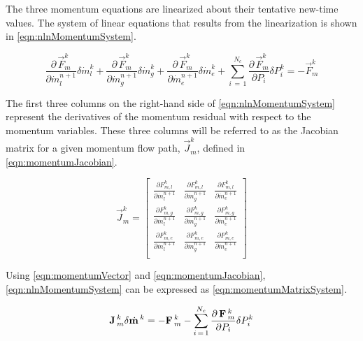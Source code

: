 The three momentum equations are linearized about their tentative new-time values.
The system of linear equations that results from the linearization is shown in \eqref{eqn:nlnMomentumSystem}.

\begin{equation}
\label{eqn:nlnMomentumSystem}
\frac{\partial\, \vec{F}^{k}_{m}}{\partial \dot{m}^{n+1}_{l}} \delta \dot{m}_{l}^{k} + \frac{\partial\, \vec{F}^{k}_{m}}{\partial \dot{m}^{n+1}_{g}} \delta \dot{m}_{g}^{k} + \frac{\partial\, \vec{F}^{k}_{m}}{\partial \dot{m}^{n+1}_{e}} \delta \dot{m}_{e}^{k} + \sum_{i\,=\,1}^{N_{c}} \frac{\partial\, \vec{F}^{k}_{m}}{\partial P_{i}} \delta P_{i}^{k} = - \vec{F}^{k}_{m}
\end{equation}

The first three columns on the right-hand side of \eqref{eqn:nlnMomentumSystem} represent the derivatives of the momentum residual with respect to the momentum variables.
These three columns will be referred to as the Jacobian matrix for a given momentum flow path, $\vec{J}^{k}_{m}$, defined in \eqref{eqn:momentumJacobian}.

\begin{equation}
\label{eqn:momentumJacobian}
\vec{J}^{k}_{m} = 
\begin{bmatrix}
\frac{\partial F^{k}_{m,l}}{\partial \dot{m}^{n+1}_{l}} & \frac{\partial F^{k}_{m,l}}{\partial \dot{m}^{n+1}_{g}} & \frac{\partial F^{k}_{m,l}}{\partial \dot{m}^{n+1}_{e}} \\
\frac{\partial F^{k}_{m,g}}{\partial \dot{m}^{n+1}_{l}} & \frac{\partial F^{k}_{m,g}}{\partial \dot{m}^{n+1}_{g}} & \frac{\partial F^{k}_{m,g}}{\partial \dot{m}^{n+1}_{e}} \\
\frac{\partial F^{k}_{m,e}}{\partial \dot{m}^{n+1}_{l}} & \frac{\partial F^{k}_{m,e}}{\partial \dot{m}^{n+1}_{g}} & \frac{\partial F^{k}_{m,e}}{\partial \dot{m}^{n+1}_{e}} \\
\end{bmatrix}
\end{equation}

Using \eqref{eqn:momentumVector} and \eqref{eqn:momentumJacobian}, \eqref{eqn:nlnMomentumSystem} can be expressed as \eqref{eqn:momentumMatrixSystem}.

\begin{equation}
\label{eqn:momentumMatrixSystem}
\vec{J}^{k}_{m} \delta \momVec{}^{k}  = - \vec{F}^{k}_{m} - \sum_{i\,=\,1}^{N_{c}} \frac{\partial\, \vec{F}^{k}_{m}}{\partial P_{i}} \delta P_{i}^{k}
\end{equation}

